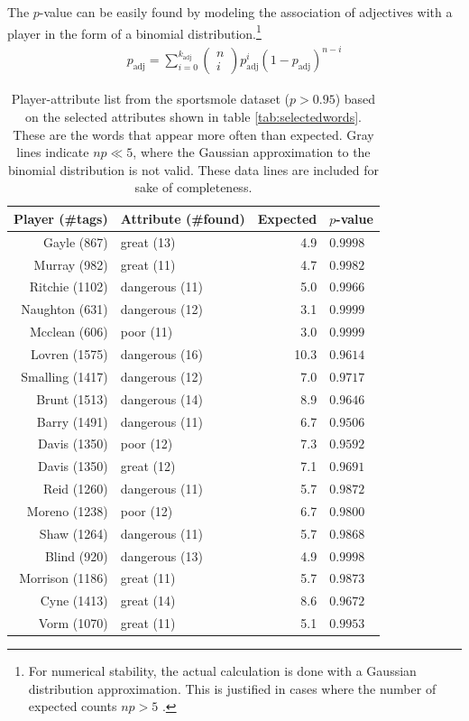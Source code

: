\documentclass[10pt, a4paper]{UUThesisTemplate}
\begin{document}
The $p$-value can be easily found by modeling the association of adjectives with a player in the form of a binomial distribution.\footnote{For numerical stability, the actual calculation is done with a Gaussian distribution approximation. This is justified in cases where the number of expected counts $np>5$ \cite{statsforexp}.}
\begin{align}
p_\text{adj} = \sum_{i=0}^{k_\text{adj}} \begin{pmatrix} n\\i\end{pmatrix} p_\text{adj}^i (1 - p_\text{adj})^{n - i}
\end{align}

\begin{table}\centering
\scriptsize
\begin{tabular}{r l r l}
Player (\#tags) & Attribute (\#found) & Expected & $p$-value\\\hline
Gayle (867) &great (13) & 4.9 & $0.9998$\\
Murray (982) &great (11) & 4.7 & $0.9982$\\
Ritchie (1102) &dangerous (11) & 5.0 & $0.9966$\\
{\color{gray}Naughton (631)} &{\color{gray}dangerous (12)} & {\color{gray}3.1} & {\color{gray}$0.9999$}\\
{\color{gray}Mcclean (606)} &{\color{gray}poor (11)} & {\color{gray}3.0} & {\color{gray}$0.9999$}\\
Lovren (1575) &dangerous (16) & 10.3 & $0.9614$\\
Smalling (1417) &dangerous (12) & 7.0 & $0.9717$\\
Brunt (1513) &dangerous (14) & 8.9 & $0.9646$\\
Barry (1491) &dangerous (11) & 6.7 & $0.9506$\\
Davis (1350) &poor (12) & 7.3 & $0.9592$\\
Davis (1350) &great (12) & 7.1 & $0.9691$\\
Reid (1260) &dangerous (11) & 5.7 & $0.9872$\\
Moreno (1238) &poor (12) & 6.7 & $0.9800$\\
Shaw (1264) &dangerous (11) & 5.7 & $0.9868$\\
Blind (920) &dangerous (13) & 4.9 & $0.9998$\\
Morrison (1186) &great (11) & 5.7 & $0.9873$\\
Cyne (1413) &great (14) & 8.6 & $0.9672$\\
Vorm (1070) &great (11) & 5.1 & $0.9953$\\\hline
\end{tabular}
\caption{Player-attribute list from the sportsmole dataset ($p>0.95$) based on the selected attributes shown in table \ref{tab:selectedwords}. These are the words that appear more often than expected. Gray lines indicate $np\ll5$, where the Gaussian approximation to the binomial distribution is not valid. These data lines are included for sake of completeness.}\label{tab:pgreater0.95}\vspace{-30pt}
\end{table}
\end{document}
